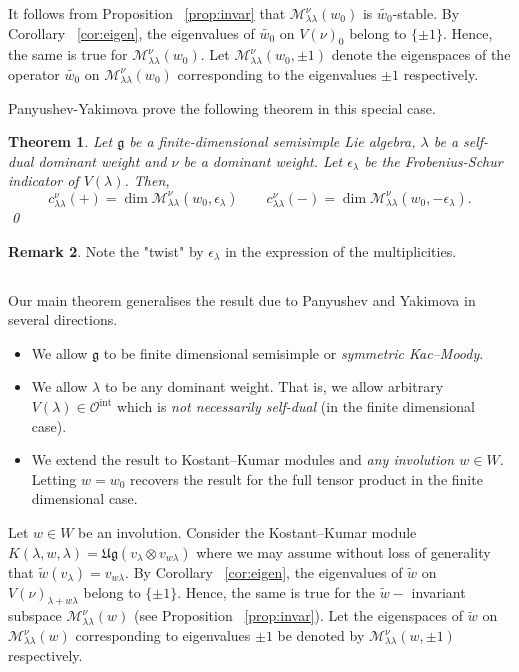 \documentclass[12pt,reqno]{amsart}
\theoremstyle{plain}
\newtheorem{theorem}{Theorem}[section]
\theoremstyle{definition}
\newtheorem{rem}[theorem]{Remark}
\theoremstyle{plain}
\newcommand{\catoint}{\mathcal{O}^{\mathrm{int}}}
\newcommand{\lie}{\mathfrak}
\begin{document}
It follows from Proposition ~\ref{prop:invar} that  $\mathcal{M}_{\lambda\lambda}^{\nu}(w_0)$ is
$\widetilde{w_0}$-stable. By Corollary ~\ref{cor:eigen}, the eigenvalues of $\widetilde{w_0}$ on $V(\nu)_0$ belong to $\{\pm1\}.$ Hence, the same is true for $\mathcal{M}_{\lambda\lambda}^{\nu}(w_0).$ Let $\mathcal{M}_{\lambda\lambda}^{\nu}(w_0,\pm1)$ denote the eigenspaces of the operator $\widetilde{w_0}$ on $\mathcal{M}_{\lambda\lambda}^{\nu}(w_0)$ corresponding to the eigenvalues $\pm 1$ respectively. 



Panyushev-Yakimova \cite{PY} prove the following theorem in this special case. 
\begin{theorem}
Let $\lie g$ be a finite-dimensional semisimple Lie algebra, $\lambda$ be a self-dual dominant weight and $\nu$ be a dominant weight. Let $\epsilon_\lambda$ be the Frobenius-Schur indicator of $V(\lambda)$. Then,
\[
c^{\nu}_{\lambda\lambda}(+)=\dim \mathcal{M}_{\lambda\lambda}^{\nu}(w_0,\epsilon_\lambda)
\qquad
c^{\nu}_{\lambda\lambda}(-)=\dim\mathcal{M}_{\lambda\lambda}^{\nu}(w_0,-\epsilon_\lambda).
\] \qed
\end{theorem}
\begin{rem}
    Note the "twist" by $\epsilon_\lambda$ in the expression of the multiplicities. 
\end{rem}

\subsection{}
Our main theorem generalises the result due to Panyushev and Yakimova in several directions.
\begin{itemize}
    \item[1.] We allow $\lie g$ to be finite dimensional semisimple or \textit{symmetric Kac--Moody}.
    \item[2.] We allow $\lambda$ to be any dominant weight. That is, we allow arbitrary $V(\lambda)\in \catoint$ which is \textit{not necessarily self-dual} (in the finite dimensional case).
    \item[3.] We extend the result to Kostant--Kumar modules and \textit{any involution $w\in W$.} Letting $w=w_0$ recovers the result for the full tensor product in the finite dimensional case.
\end{itemize}

Let $w\in W$ be an involution. Consider the Kostant--Kumar module $K(\lambda,w,\lambda)=\mathfrak{Ug} (v_\lambda\otimes v_{w\lambda})$ where we may assume without loss of generality that $\widetilde{w}(v_\lambda)=v_{w\lambda}.$ By Corollary ~\ref{cor:eigen}, the eigenvalues of $\widetilde{w}$ on $V(\nu)_{\lambda+w\lambda}$ belong to $\{\pm1\}.$ Hence, the same is true for the $\widetilde{w}-$ invariant subspace $\mathcal{M}_{\lambda\lambda}^{\nu}(w)$ (see Proposition ~\ref{prop:invar}). Let the eigenspaces of $\widetilde{w}$ on $\mathcal{M}_{\lambda\lambda}^{\nu}(w)$ corresponding to eigenvalues $\pm1$ be denoted by $\mathcal{M}_{\lambda\lambda}^{\nu}(w,\pm1)$ respectively.
\end{document}
